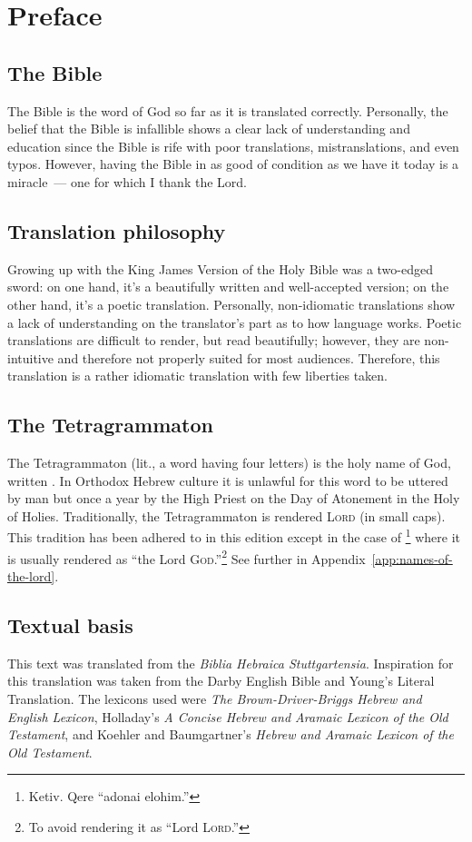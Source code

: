 \onecolumn
\chapter*{Preface}
\section*{The Bible}
The Bible is the word of God so far as it is translated correctly. Personally, the belief that the Bible is infallible shows a clear lack of understanding and education since the Bible is rife with poor translations, mistranslations, and even typos. However, having the Bible in as good of condition as we have it today is a miracle~--- one for which I thank the Lord.

\section*{Translation philosophy}
Growing up with the King James Version of the Holy Bible was a two-edged sword: on one hand, it's a beautifully written and well-accepted version; on the other hand, it's a poetic translation. Personally, non-idiomatic translations show a lack of understanding on the translator's part as to how language works. Poetic translations are difficult to render, but read beautifully; however, they are non-intuitive and therefore not properly suited for most audiences. Therefore, this translation is a rather idiomatic translation with few liberties taken.

\section*{The Tetragrammaton}
The Tetragrammaton (lit., a word having four letters) is the holy name of God, written . In Orthodox Hebrew culture it is unlawful for this word to be uttered by man but once a year by the High Priest on the Day of Atonement in the Holy of Holies. Traditionally, the Tetragrammaton is rendered \textsc{Lord} (in small caps). This tradition has been adhered to in this edition except in the case of \footnote{Ketiv. Qere ``adonai elohim.''} where it is usually rendered as ``the Lord \textsc{God}.''\footnote{To avoid rendering it as ``Lord \textsc{Lord}.''} See further in Appendix~\ref{app:names-of-the-lord}.

\section*{Textual basis}
This text was translated from the \emph{Biblia Hebraica Stuttgartensia}. Inspiration for this translation was taken from the Darby English Bible and Young's Literal Translation. The lexicons used were \emph{The Brown-Driver-Briggs Hebrew and English Lexicon}, Holladay's \emph{A Concise Hebrew and Aramaic Lexicon of the Old Testament}, and Koehler and Baumgartner's \emph{Hebrew and Aramaic Lexicon of the Old Testament}.

